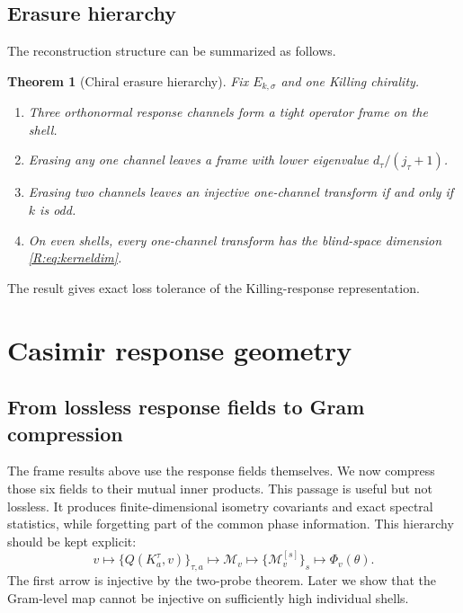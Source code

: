 \documentclass[
 aps,
 prd,
 reprint,
 amsmath,
 amssymb,
 nofootinbib,
 superscriptaddress
]{revtex4-2}
\newtheorem{theorem}{Theorem}[section]
\theoremstyle{definition}
\theoremstyle{remark}
\begin{document}
\subsection{Erasure hierarchy}

The reconstruction structure can be summarized as follows.

\begin{theorem}[Chiral erasure hierarchy]
\label{R:thm:erasure}
Fix $E_{k,\sigma}$ and one Killing chirality.

\begin{enumerate}[label=(\roman*)]
\item Three orthonormal response channels form a tight operator frame on the
shell.

\item Erasing any one channel leaves a frame with lower eigenvalue
$d_\tau/(j_\tau+1)$.

\item Erasing two channels leaves an injective one-channel transform if and
only if $k$ is odd.

\item On even shells, every one-channel transform has the blind-space
dimension \eqref{R:eq:kerneldim}.
\end{enumerate}
\end{theorem}

The result gives exact loss tolerance of the Killing-response representation.


\section{Casimir response geometry}

\subsection{From lossless response fields to Gram compression}

The frame results above use the response fields themselves.  We now compress
those six fields to their mutual inner products.  This passage is useful but
not lossless.  It produces finite-dimensional isometry covariants and exact
spectral statistics, while forgetting part of the common phase information.
This hierarchy should be kept explicit:
\[
\boxed{
v
\longmapsto
\{Q(K_a^\tau,v)\}_{\tau,a}
\longmapsto
\mathscr M_v
\longmapsto
\{\mathscr M_v^{[s]}\}_{s}
\longmapsto
\Phi_v(\theta).
}
\]
The first arrow is injective by the two-probe theorem.  Later we show that the
Gram-level map cannot be injective on sufficiently high individual shells.
\end{document}
